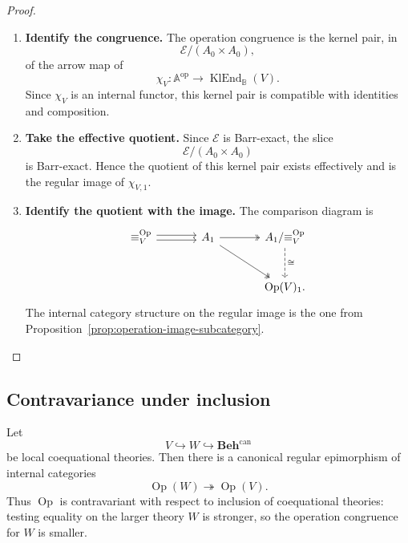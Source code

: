 \begin{proof}
    \leavevmode
    \begin{enumerate}
        \item \textbf{Identify the congruence.}
        The operation congruence is the kernel pair, in
        \[
            \mathcal E/(A_0\times A_0),
        \]
        of the arrow map of
        \[
            \chi_V:
            \mathbb A^{\mathrm{op}}
            \to
            \operatorname{KlEnd}_{\mathbb B}(V).
        \]
        Since \(\chi_V\) is an internal functor, this kernel pair is compatible
        with identities and composition.

        \item \textbf{Take the effective quotient.}
        Since \(\mathcal E\) is Barr-exact, the slice
        \[
            \mathcal E/(A_0\times A_0)
        \]
        is Barr-exact. Hence the quotient of this kernel pair exists
        effectively and is the regular image of \(\chi_{V,1}\).

        \item \textbf{Identify the quotient with the image.}
        The comparison diagram is
        \[
        \begin{tikzcd}[column sep=large, row sep=large]
            {\equiv^{\operatorname{Op}}_V}
                \arrow[r, shift left=0.5ex]
                \arrow[r, shift right=0.5ex]
            &
            A_1
                \arrow[r, two heads]
                \arrow[dr, two heads]
            &
            A_1/{\equiv^{\operatorname{Op}}_V}
                \arrow[d, dashed, "\cong"]
            \\
            &&
            \operatorname{Op}(V)_1 .
        \end{tikzcd}
        \]
        The internal category structure on the regular image is the one from
        Proposition~\ref{prop:operation-image-subcategory}.
    \end{enumerate}
\end{proof}

\subsection{Contravariance under inclusion}
\label{subsec:operation-image-contravariance}

\begin{proposition}
\label{prop:operation-image-contravariant}
    Let
    \[
        V\hookrightarrow W\hookrightarrow \mathbf{Beh}^{\mathrm{can}}
    \]
    be local coequational theories. Then there is a canonical regular
    epimorphism of internal categories
    \[
        \operatorname{Op}(W)\twoheadrightarrow \operatorname{Op}(V).
    \]
    Thus \(\operatorname{Op}\) is contravariant with respect to inclusion of
    coequational theories: testing equality on the larger theory \(W\) is
    stronger, so the operation congruence for \(W\) is smaller.
\end{proposition}


